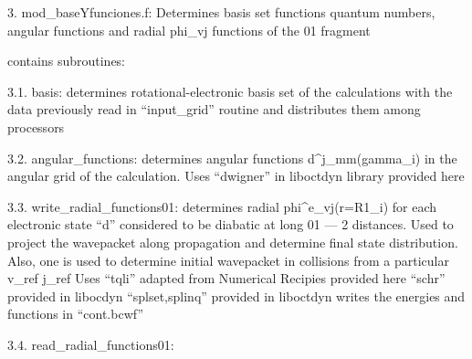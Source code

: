 3. mod_baseYfunciones.f: Determines basis set functions quantum numbers, angular functions 
                         and radial phi_vj functions of the 01 fragment

          contains subroutines:
                                 
                                  3.1. basis: determines rotational-electronic basis set of the calculations
                                               with the data previously read in ``input_grid'' routine
                                               and distributes them among processors
             
                                  3.2. angular_functions: determines angular functions d^j_mm(gamma_i)
                                               in the angular grid of the calculation.
                                               Uses
                                                     ``dwigner''  in liboctdyn library provided here

                                  3.3. write_radial_functions01: determines radial phi^e_vj(r=R1_i) 
                                               for each electronic state ``d'' considered to be diabatic
                                               at long 01 --- 2 distances. 
                                               Used to project the wavepacket along propagation and determine final
                                               state distribution. Also, one is used to determine initial
                                               wavepacket in collisions from a particular v_{ref} j_{ref}
                                               Uses
                                                       ``tqli'' adapted from Numerical Recipies provided here
                                                       ``schr'' provided in libocdyn
                                                       ``splset,splinq'' provided in liboctdyn
                                               writes the energies and functions in ``cont.bcwf''

                                  3.4. read_radial_functions01:
